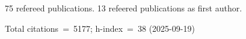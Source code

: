 75 refereed publications. 13 refeered publications as first author.

Total citations~=~5177; h-index~=~38 (2025-09-19)